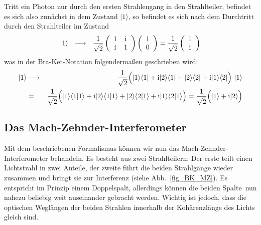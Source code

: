 Tritt ein Photon nur durch den ersten Strahlengang in den Strahlteiler, befindet es sich also
zun\"achst in dem Zustand $|1\rangle$, so befindet es sich nach dem Durchtritt durch den
Strahlteiler im Zustand
\begin{equation}
             | 1 \rangle ~~ \longrightarrow ~~  \frac{1}{\sqrt{2}} \left( \begin{array}{cc}
                 1 & {\rm i} \\ {\rm i} & 1 \end{array} \right)  \left( \begin{array}{c}
         1 \\ 0  \end{array} \right)  = \frac{1}{\sqrt{2}} \left( \begin{array}{c}  1 \\ {\rm i} \end{array} \right) 
\end{equation}
was in der Bra-Ket-Notation folgenderma\ss en geschrieben wird:
\begin{eqnarray}
             | 1 \rangle  & \longrightarrow &  \frac{1}{\sqrt{2}} \Big(  |1\rangle \langle 1| +  
            {\rm i} |2\rangle \langle 1| + |2\rangle \langle 2| + {\rm i} |1\rangle \langle 2| \Big) ~ |1\rangle \\
             &=&    \frac{1}{\sqrt{2}}  \Big(  |1\rangle \langle 1| 1\rangle  +
            {\rm i} |2\rangle \langle 1|1\rangle + |2\rangle \langle 2|1\rangle + {\rm i} |1\rangle \langle 2|1\rangle \Big)
            =  \frac{1}{\sqrt{2}} \Big( |1\rangle + {\rm i} |2\rangle \Big) 
\end{eqnarray}

\subsection{Das Mach-Zehnder-Interferometer}

Mit dem beschriebenen Formalismus k\"onnen wir nun das Mach-Zehnder-Interferometer
behandeln. 
Es besteht aus zwei Strahlteilern: Der erste teilt einen Lichtstrahl in zwei Anteile,
der zweite f\"uhrt die beiden Strahlg\"ange wieder zusammen
und bringt sie zur Interferenz (siehe Abb.\ \ref{fig_BK_MZ}). Es entspricht im Prinzip einem Doppelspalt, 
allerdings k\"onnen die beiden \glqq Spalte\grqq\ nun nahezu beliebig weit auseinander gebracht 
werden. Wichtig ist jedoch, dass die optischen Wegl\"angen der beiden Strahlen innerhalb der
Koh\"arenzl\"ange des Lichts gleich sind. 

